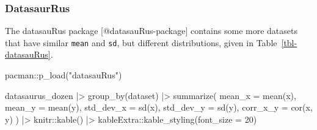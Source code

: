 \documentclass[
  letterpaper,
  DIV=11,
  numbers=noendperiod]{scrartcl}
\newenvironment{Shaded}{\begin{snugshade}}{\end{snugshade}}
\newcommand{\AttributeTok}[1]{\textcolor[rgb]{0.40,0.45,0.13}{#1}}
\newcommand{\DecValTok}[1]{\textcolor[rgb]{0.68,0.00,0.00}{#1}}
\newcommand{\FunctionTok}[1]{\textcolor[rgb]{0.28,0.35,0.67}{#1}}
\newcommand{\NormalTok}[1]{\textcolor[rgb]{0.00,0.23,0.31}{#1}}
\newcommand{\SpecialCharTok}[1]{\textcolor[rgb]{0.37,0.37,0.37}{#1}}
\newcommand{\StringTok}[1]{\textcolor[rgb]{0.13,0.47,0.30}{#1}}
\begin{document}
\hypertarget{datasaurrus}{%
\subsubsection{DatasaurRus}\label{datasaurrus}}

The datasauRus package {[}@datasauRus-package{]} contains some more
datasets that have similar \texttt{mean} and \texttt{sd}, but different
distributions, given in Table~\ref{tbl-datasauRus}.

\begin{Shaded}
\begin{Highlighting}[]
\NormalTok{pacman}\SpecialCharTok{::}\FunctionTok{p\_load}\NormalTok{(}\StringTok{"datasauRus"}\NormalTok{)}
\end{Highlighting}
\end{Shaded}

\begin{Shaded}
\begin{Highlighting}[]
\NormalTok{datasaurus\_dozen }\SpecialCharTok{|\textgreater{}}
    \FunctionTok{group\_by}\NormalTok{(dataset) }\SpecialCharTok{|\textgreater{}}
    \FunctionTok{summarize}\NormalTok{(}
      \AttributeTok{mean\_x    =} \FunctionTok{mean}\NormalTok{(x),}
      \AttributeTok{mean\_y    =} \FunctionTok{mean}\NormalTok{(y),}
      \AttributeTok{std\_dev\_x =} \FunctionTok{sd}\NormalTok{(x),}
      \AttributeTok{std\_dev\_y =} \FunctionTok{sd}\NormalTok{(y),}
      \AttributeTok{corr\_x\_y  =} \FunctionTok{cor}\NormalTok{(x, y)}
\NormalTok{    ) }\SpecialCharTok{|\textgreater{}}
\NormalTok{  knitr}\SpecialCharTok{::}\FunctionTok{kable}\NormalTok{() }\SpecialCharTok{|\textgreater{}}
\NormalTok{  kableExtra}\SpecialCharTok{::}\FunctionTok{kable\_styling}\NormalTok{(}\AttributeTok{font\_size =} \DecValTok{20}\NormalTok{)}
\end{Highlighting}
\end{Shaded}
\end{document}
